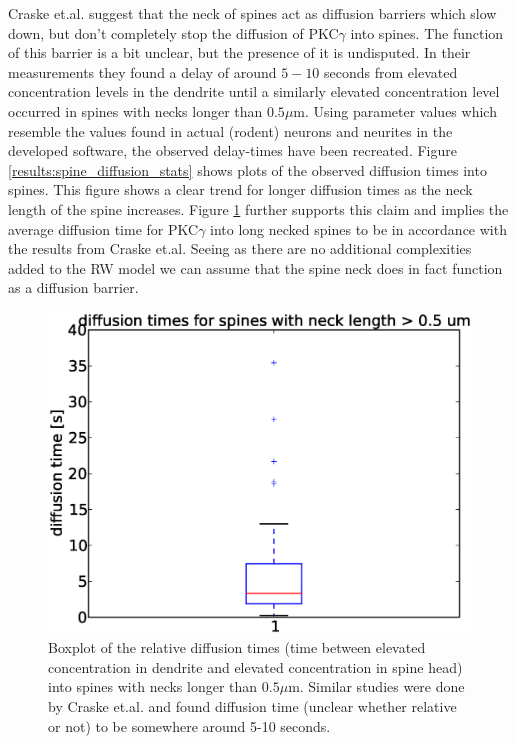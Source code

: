 Craske et.al. \cite{craske2005spines} suggest that the neck of spines act as diffusion barriers which slow down, but don't completely stop the diffusion of PKC$\gamma$ into spines. 
The function of this barrier is a bit unclear, but the presence of it is undisputed. 
In their measurements they found a delay of around $5-10$ seconds from elevated concentration levels in the dendrite until a similarly elevated concentration level occurred in spines with necks longer than $0.5\mu$m. 
Using parameter values which resemble the values found in actual (rodent) neurons and neurites in the developed software, the observed delay-times have been recreated. 
Figure \ref{results:spine_diffusion_stats} shows plots of the observed diffusion times into spines. 
This figure shows a clear trend for longer diffusion times as the neck length of the spine increases. 
Figure \ref{results:boxplot_relative_diffusiontime_long_neck} further supports this claim and implies the average diffusion time for PKC$\gamma$ into long necked spines to be in accordance with the results from Craske et.al.
Seeing as there are no additional complexities added to the RW model we can assume that the spine neck does in fact function as a diffusion barrier.
\begin{figure}[h]
 \centering
 \includegraphics[scale=0.5]{Figures/spine_stats_boxplot_reltime_longneck.eps}
 \caption[Diffusion time for long necked spines]{Boxplot of the relative diffusion times (time between elevated concentration in dendrite and elevated concentration in spine head) into spines with necks longer than $0.5\mu$m. Similar studies were done by Craske et.al. \cite{craske2005spines} and found diffusion time (unclear whether relative or not) to be somewhere around 5-10 seconds.}
 \label{results:boxplot_relative_diffusiontime_long_neck}
\end{figure}

